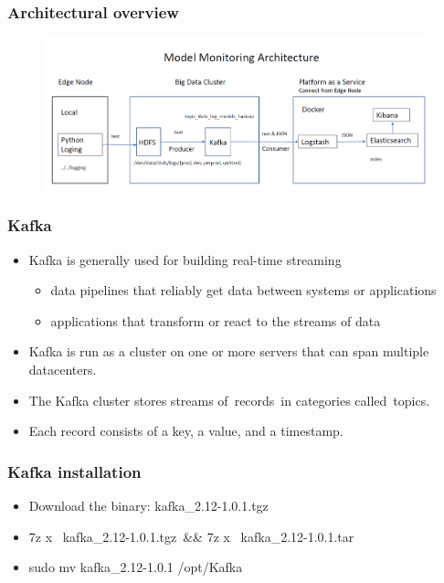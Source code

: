 \documentclass[11pt]{beamer}
\begin{document}
\begin{frame}
\frametitle{Architectural overview}
\begin{figure}[h]
	\includegraphics[scale=.3]{images/arch2}
\end{figure}
\end{frame}

\begin{frame}
\frametitle{Kafka}
\begin{itemize}
	\item Kafka is generally used for building real-time streaming 
	\begin{itemize}
		\item data pipelines that reliably get data between systems or applications
		\item applications that transform or react to the streams of data
	\end{itemize}
	\item Kafka is run as a cluster on one or more servers that can span multiple datacenters.
	\item The Kafka cluster stores streams of records in categories called topics.
	\item Each record consists of a key, a value, and a timestamp.
\end{itemize}
\end{frame}

\begin{frame}
\frametitle{Kafka installation}
\begin{itemize}
	\item Download the binary: kafka\_2.12-1.0.1.tgz 
	\item 7z x  kafka\_2.12-1.0.1.tgz \&\& 7z x  kafka\_2.12-1.0.1.tar
	\item sudo mv kafka\_2.12-1.0.1 /opt/Kafka
\end{itemize}
\end{frame}
\end{document}
